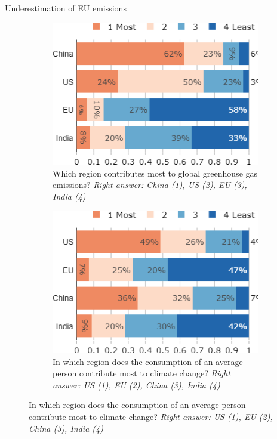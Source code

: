\begin{framefont}{\small}
\begin{frame}{Underestimation of EU emissions}%
\begin{figure}[h!]
\centering
\begin{subfigure}[b]{0.425\paperwidth}
\centering
\caption{Which region contributes most to global greenhouse gas emissions?
\newline \footnotesize{\textit{Right answer: China (1), US (2), EU (3), India (4)}}} %
\includegraphics[width=.425\paperwidth]{../figures/FR/footprint_region_no_miss_FR.png}
\end{subfigure}
\hfill
\begin{subfigure}[b]{0.425\paperwidth}
\centering
\caption{In which region does the consumption of an average person contribute most to climate change?
\newline \footnotesize{\textit{Right answer: US (1), EU (2), China (3), India (4)}}} %
\includegraphics[width=.425\paperwidth]{../figures/FR/footprint_pc_no_miss_FR.png}
\end{subfigure}
\end{figure}
\end{frame}


\end{framefont}
